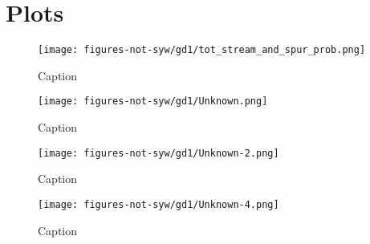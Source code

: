\documentclass[twocolumn]{aastex631}
\begin{document}
\section{Plots} \label{app:developing_plots}

    \begin{figure*}
        \centering
        \texttt{[image: figures-not-syw/gd1/tot\_stream\_and\_spur\_prob.png]}
        \caption{Caption}
        \label{fig:gd1-astrometrics}
    \end{figure*}

    \begin{figure*}
        \centering
        \texttt{[image: figures-not-syw/gd1/Unknown.png]}
        \caption{Caption}
        \label{fig:gd1-distance_modulus}
    \end{figure*}

    \begin{figure}
        \centering
        \texttt{[image: figures-not-syw/gd1/Unknown-2.png]}
        \caption{Caption}
        \label{fig:gd1-cmd}
    \end{figure}

    \begin{figure*}
        \centering
        \texttt{[image: figures-not-syw/gd1/Unknown-4.png]}
        \caption{Caption}
        \label{fig:gd1-cmds}
    \end{figure*}
\end{document}
